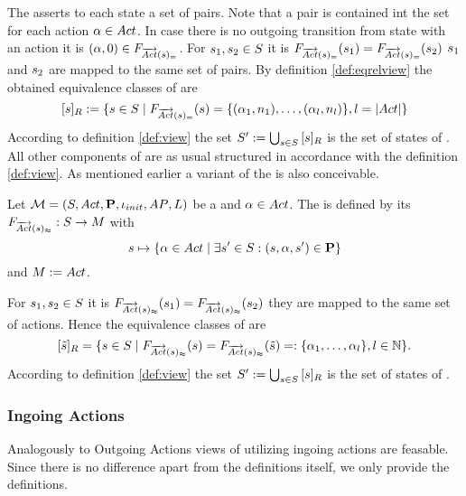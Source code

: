 \documentclass[preview]{standalone}
\begin{document}
The \grpfctN asserts to each state a set of pairs. Note that a pair is contained int the set for each action ${\alpha} \in {Act}$. In case there is no outgoing transition from state \state with an action \action it is $(\action, 0) \in \gfctstrongoutactident$. For ${s}_1, {s}_2 \in {S}$ it is ${{{{F}}_{{\overrightarrow{{Act}}}({s})_=}}}({s}_1) = {{{{F}}_{{\overrightarrow{{Act}}}({s})_=}}}({s}_2)$ \iffN ${s}_1$ and ${s}_2$ are mapped to the same set of pairs. By definition \ref{def:eqrelview} the obtained equivalence classes of \eqrelview are
\[
	\eqclassv{\state} := \{\state \in \states \mid \gfctstrongoutactident(\state) = \{(\action_1, \numoutact_1), \dots, (\action_l, \numoutact_l)\}, l = |\actions|\}
\]
According to definition \ref{def:view} the set ${S}' := \bigcup_{{s} \in {S}} {{[{s}]_{{R}}}}$ is the set of states of \viewstrongoutactident. All other components of \viewstrongoutactident are as usual structured in accordance with the definition \ref{def:view}.
As mentioned earlier a \outactidentweak variant of the \outactident \viewN is also conceivable.

\begin{definition}
	Let ${{{\mathcal{M}}}} = {{({S}, {Act}, {\textbf{P}}, {\iota_{init}}, {AP}, {L})}}$ be a \chosengraphtypeN and ${\alpha} \in {Act}$. The \viewN \viewweakoutactident is defined by its \grpfctN ${{{{F}}_{{\overrightarrow{{Act}}}({s})_\approx}}} : {S} \to {\ensuremath{{M}}}$ with
	\[
	{s} \mapsto \{{\alpha} \in {Act} \mid \exists {s}' \in {S} : ({s}, {\alpha}, {s}') \in {\ensuremath{{\textbf{P}}}}\} 	
	\]
	and ${{M}} := {Act}$.
\end{definition}


For ${s}_1, {s}_2 \in {S}$ it is ${{{{F}}_{{\overrightarrow{{Act}}}({s})_\approx}}}({s}_1) = {{{{F}}_{{\overrightarrow{{Act}}}({s})_\approx}}}({s}_2)$ \iffN they are mapped to the same set of actions. Hence the equivalence classes of \eqrelview are
\[
	\eqclassv{\smstate} = \{ \state \in \states \mid \gfctweakoutactident(\state) = \gfctweakoutactident(\smstate) =: \{\action_1, \dots, \action_l\}, l \in \natnums\}.
\]
According to definition \ref{def:view} the set ${S}' := \bigcup_{{s} \in {S}} {{[{s}]_{{R}}}}$ is the set of states of \viewweakoutactident.

\subsubsection{Ingoing Actions}
Analogously to Outgoing Actions views of utilizing ingoing actions are feasable. Since there is no difference apart from the definitions itself, we only provide the definitions.
\end{document}
